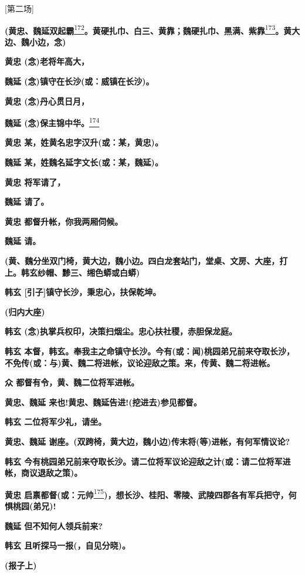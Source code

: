 {[}第二场{]}

\textbf{(黄忠、魏延双起霸}\protect\hyperlink{fn172}{\textsuperscript{172}}\textbf{。黄硬扎巾、白三、黄靠；魏硬扎巾、黑满、紫靠}\protect\hyperlink{fn173}{\textsuperscript{173}}\textbf{。黄大边、魏小边，念)}

\textbf{黄忠 (念)老将年高大，}

\textbf{魏延 (念)镇守在长沙(或：威镇在长沙)。}

\textbf{黄忠 (念)丹心贯日月，}

\textbf{魏延
(念)保主锦中华。}\protect\hyperlink{fn174}{\textsuperscript{174}}

\textbf{黄忠 某，姓黄名忠字汉升(或：某，黄忠)。}

\textbf{魏延 某，姓魏名延字文长(或：某，魏延)。}

\textbf{黄忠 将军请了，}

\textbf{魏延 请了。}

\textbf{黄忠 都督升帐，你我两厢伺候。}

\textbf{魏延 请。}

\textbf{(黄、魏分坐双门椅，黄大边，魏小边。四白龙套站门，堂桌、文房、大座，打上。韩玄纱帽、黪三、缃色蟒或白蟒)}

\textbf{韩玄 {[}引子{]}镇守长沙，秉忠心，扶保乾坤。}

\textbf{(归内大座)}

\textbf{韩玄 (念)执掌兵权印，决策扫烟尘。忠心扶社稷，赤胆保龙庭。}

\textbf{韩玄
本督，韩玄。奉我主之命镇守长沙。今有(或：闻)桃园弟兄前来夺取长沙，不免传(或：与)黄、魏二将进帐，议论迎敌之策。来，传黄、魏二将进帐。}

\textbf{众 都督有令，黄、魏二位将军进帐。}

\textbf{黄忠、魏延 来也!黄忠、魏延告进!(挖进去)参见都督。}

\textbf{韩玄 二位将军少礼，请坐。}

\textbf{黄忠、魏延
谢座。(双跨椅，黄大边，魏小边)传末将(等)进帐，有何军情议论?}

\textbf{韩玄
今有桃园弟兄前来夺取长沙。请二位将军议论迎敌之计(或：请二位将军进帐，商议退敌之策)。}

\textbf{黄忠
启禀都督(或：元帅}\protect\hyperlink{fn175}{\textsuperscript{175}}\textbf{)，想长沙、桂阳、零陵、武陵四郡各有军兵把守，何惧桃园(弟兄)!}

\textbf{魏延 但不知何人领兵前来?}

\textbf{韩玄 且听探马一报(，自见分晓)。}

\textbf{(报子上)}

